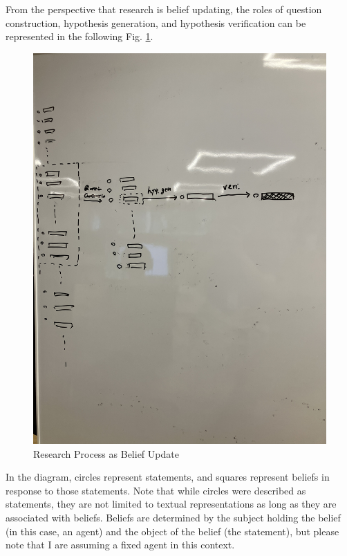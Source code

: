 \documentclass{book}
\begin{document}
From the perspective that research is belief updating, the roles of question construction, hypothesis generation, and hypothesis verification can be represented in the following Fig. \ref{fig:beliefupdate}. 
\begin{figure}[htb]
    \centering
    \includegraphics[width=\textwidth]{figs/beliefupdate.jpg}
    \caption{Research Process as Belief Update}
    \label{fig:beliefupdate}
\end{figure}
In the diagram, circles represent statements, and squares represent beliefs in response to those statements. Note that while circles were described as statements, they are not limited to textual representations as long as they are associated with beliefs. Beliefs are determined by the subject holding the belief (in this case, an agent) and the object of the belief (the statement), but please note that I are assuming a fixed agent in this context.
\end{document}
